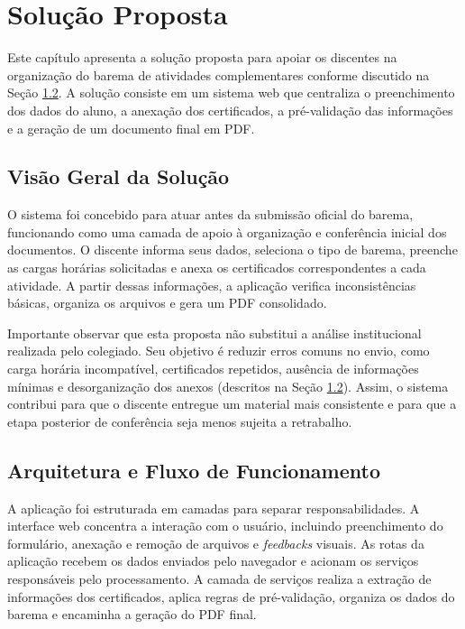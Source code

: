 \chapter{Solução Proposta}
\label{cap:solucao-proposta}

Este capítulo apresenta a solução proposta para apoiar os discentes na organização do barema de atividades complementares conforme discutido na Seção \ref{}. A solução consiste em um sistema web que centraliza o preenchimento dos dados do aluno, a anexação dos certificados, a pré-validação das informações e a geração de um documento final em PDF.

\section{Visão Geral da Solução}


O sistema foi concebido para atuar antes da submissão oficial do barema, funcionando como uma camada de apoio à organização e conferência inicial dos documentos. O discente informa seus dados, seleciona o tipo de barema, preenche as cargas horárias solicitadas e anexa os certificados correspondentes a cada atividade. A partir dessas informações, a aplicação verifica inconsistências básicas, organiza os arquivos e gera um PDF consolidado.

Importante observar que esta proposta não substitui a análise institucional realizada pelo colegiado. Seu objetivo é reduzir erros comuns no envio, como carga horária incompatível, certificados repetidos, ausência de informações mínimas e desorganização dos anexos (descritos na Seção \ref{}). Assim, o sistema contribui para que o discente entregue um material mais consistente e para que a etapa posterior de conferência seja menos sujeita a retrabalho.

\section{Arquitetura e Fluxo de Funcionamento}

A aplicação foi estruturada em camadas para separar responsabilidades. A interface web concentra a interação com o usuário, incluindo preenchimento do formulário, anexação e remoção de arquivos e \textit{feedbacks} visuais. As rotas da aplicação recebem os dados enviados pelo navegador e acionam os serviços responsáveis pelo processamento. A camada de serviços realiza a extração de informações dos certificados, aplica regras de pré-validação, organiza os dados do barema e encaminha a geração do PDF final.

